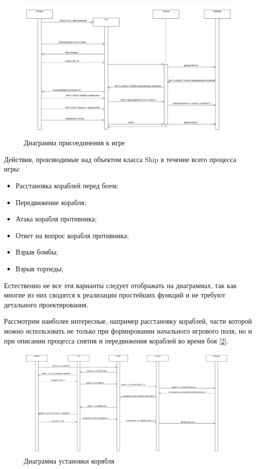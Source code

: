 \begin{figure}[pt]
\centering
\includegraphics[width=18cm]{images/JG.png}
\caption{Диаграмма присоединения к игре}
\label{fig10}
\end{figure}

Действия, производимые над объектом класса Ship в течение всего процесса игры:
	\begin{itemize}
		\item Расстановка кораблей перед боем;
		\item Передвижение корабля;
		\item Атака корабля противника;
		\item Ответ на вопрос корабля противника;
		\item Взрыв бомбы;
		\item Взрыв торпеды;
  	\end{itemize} 
Естественно не все эти варианты следует отображать на диаграммах, так как многие из них сводятся к реализации простейших функций и не требуют детального проектирования. 

Рассмотрим наиболее интересные, например расстановку кораблей, части которой можно использовать не только при формировании начального игрового поля, но и при описании процесса снятия и передвижения кораблей во время боя [\ref{fig11}].

\begin{figure}[pt]
\centering
\includegraphics[width=18cm]{images/CRS.png}
\caption{Диаграмма установки корябля}
\label{fig11}
\end{figure}

